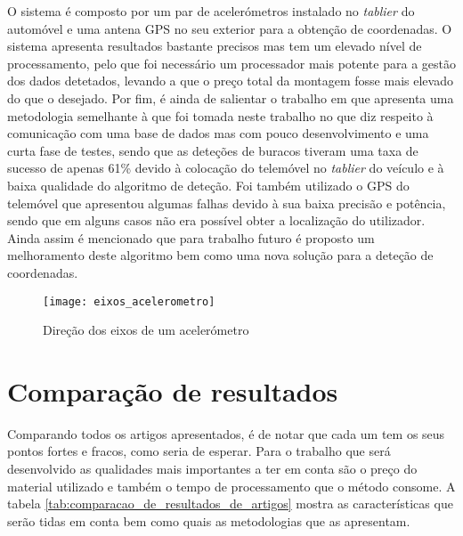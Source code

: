 O sistema é composto por um par de acelerómetros instalado no \emph{tablier} do automóvel e uma antena GPS no seu exterior para a obtenção de coordenadas.
O sistema apresenta resultados bastante precisos mas tem um elevado nível de processamento, pelo que foi necessário um processador mais potente para a gestão dos dados detetados, levando a que o preço total da montagem fosse mais elevado do que o desejado. 
Por fim, é ainda de salientar o trabalho em \cite{Kattan2014} que apresenta uma metodologia semelhante à que foi tomada neste trabalho no que diz respeito à comunicação com uma base de dados mas com pouco desenvolvimento e uma curta fase de testes, sendo que as deteções de buracos tiveram uma taxa de sucesso de apenas 61\% devido à colocação do telemóvel no \emph{tablier} do veículo e à baixa qualidade do algoritmo de deteção.
Foi também utilizado o GPS do telemóvel que apresentou algumas falhas devido à sua baixa precisão e potência, sendo que em alguns casos não era possível obter a localização do utilizador.
Ainda assim é mencionado que para trabalho futuro é proposto um melhoramento deste algoritmo bem como uma nova solução para a deteção de coordenadas.

\begin{figure}[hbtp]
	\centering
	\texttt{[image: eixos\_acelerometro]}
	\caption[Direção dos eixos de um acelerómetro]{Direção dos eixos de um acelerómetro \footnotemark}
	\label{fig:direcao_dos_eixos_de_um_acelerometro}
\end{figure}


\section{Comparação de resultados} %
\label{sec:comapracao_de_resultados}

Comparando todos os artigos apresentados, é de notar que cada um tem os seus pontos fortes e fracos, como seria de esperar. Para o trabalho que será desenvolvido as qualidades mais importantes a ter em conta são o preço do material utilizado e também o tempo de processamento que o método consome. A tabela \ref{tab:comparacao_de_resultados_de_artigos} mostra as características que serão tidas em conta bem como quais as metodologias que as apresentam.

